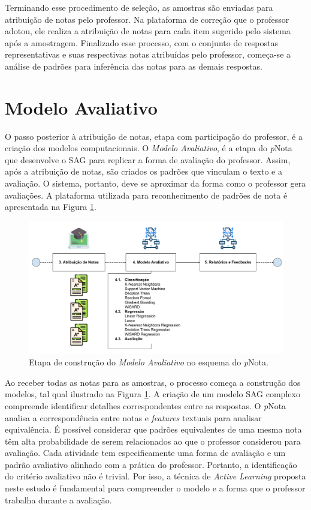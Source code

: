 Terminando esse procedimento de seleção, as amostras são enviadas para atribuição de notas pelo professor. Na plataforma de correção que o professor adotou, ele realiza a atribuição de notas para cada item sugerido pelo sistema após a amostragem. Finalizado esse processo, com o conjunto de respostas representativas e suas respectivas notas atribuídas pelo professor, começa-se a análise de padrões para inferência das notas para as demais respostas.

\section{Modelo Avaliativo}
\label{sec-avaliacao}

O passo posterior à atribuição de notas, etapa com participação do professor, é a criação dos modelos computacionais. O \textit{Modelo Avaliativo}, é a etapa do \textit{p}Nota que desenvolve o SAG para replicar a forma de avaliação do professor. Assim, após a atribuição de notas, são criados os padrões que vinculam o texto e a avaliação.  O sistema, portanto, deve se aproximar da forma como o professor gera avaliações. A plataforma utilizada para reconhecimento de padrões de nota é apresentada na Figura \ref{fig-ma}.

\begin{figure}[!h]
\centering
\includegraphics[width=\textwidth]{figuras/esquema-ma-pNota.png}
\caption{Etapa de construção do \textit{Modelo Avaliativo} no esquema do \textit{p}Nota.}
\label{fig-ma}
\end{figure}

Ao receber todas as notas para as amostras, o processo começa a construção dos modelos, tal qual ilustrado na Figura \ref{fig-ma}. A criação de um modelo SAG complexo compreende identificar detalhes correspondentes entre as respostas. O \textit{p}Nota analisa a correspondência entre notas e \textit{features} textuais para analisar equivalência. É possível considerar que padrões equivalentes de uma mesma nota têm alta probabilidade de serem relacionados ao que o professor considerou para avaliação. Cada atividade tem especificamente uma forma de avaliação e um padrão avaliativo alinhado com a prática do professor. Portanto, a identificação do critério avaliativo não é trivial. Por isso, a técnica de \textit{Active Learning} proposta neste estudo é fundamental para compreender o modelo e a forma que o professor trabalha durante a avaliação.

